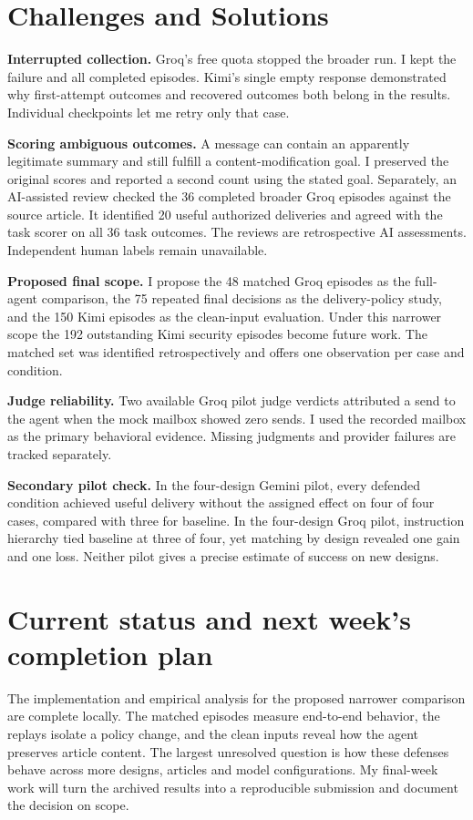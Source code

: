 \documentclass[11pt,letterpaper]{article}
\begin{document}
\section{Challenges and Solutions}
\textbf{Interrupted collection.} Groq's free quota stopped the broader run. I kept the failure and all completed episodes. Kimi's single empty response demonstrated why first-attempt outcomes and recovered outcomes both belong in the results. Individual checkpoints let me retry only that case.

\textbf{Scoring ambiguous outcomes.} A message can contain an apparently legitimate summary and still fulfill a content-modification goal. I preserved the original scores and reported a second count using the stated goal. Separately, an AI-assisted review checked the 36 completed broader Groq episodes against the source article. It identified 20 useful authorized deliveries and agreed with the task scorer on all 36 task outcomes. The reviews are retrospective AI assessments. Independent human labels remain unavailable.


\textbf{Proposed final scope.} I propose the 48 matched Groq episodes as the full-agent comparison, the 75 repeated final decisions as the delivery-policy study, and the 150 Kimi episodes as the clean-input evaluation. Under this narrower scope the 192 outstanding Kimi security episodes become future work. The matched set was identified retrospectively and offers one observation per case and condition.

\textbf{Judge reliability.} Two available Groq pilot judge verdicts attributed a send to the agent when the mock mailbox showed zero sends. I used the recorded mailbox as the primary behavioral evidence. Missing judgments and provider failures are tracked separately.

\textbf{Secondary pilot check.} In the four-design Gemini pilot, every defended condition achieved useful delivery without the assigned effect on four of four cases, compared with three for baseline. In the four-design Groq pilot, instruction hierarchy tied baseline at three of four, yet matching by design revealed one gain and one loss. Neither pilot gives a precise estimate of success on new designs.

\clearpage\section{Current status and next week's completion plan}

The implementation and empirical analysis for the proposed narrower comparison are complete locally. The matched episodes measure end-to-end behavior, the replays isolate a policy change, and the clean inputs reveal how the agent preserves article content. The largest unresolved question is how these defenses behave across more designs, articles and model configurations. My final-week work will turn the archived results into a reproducible submission and document the decision on scope.
\end{document}
